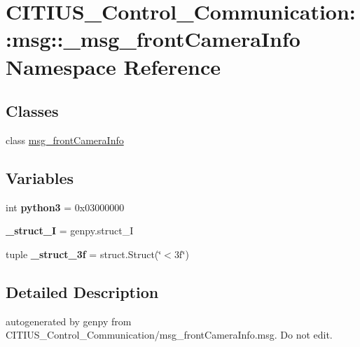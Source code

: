 \hypertarget{namespace_c_i_t_i_u_s___control___communication_1_1msg_1_1__msg__front_camera_info}{\section{\-C\-I\-T\-I\-U\-S\-\_\-\-Control\-\_\-\-Communication\-:\-:msg\-:\-:\-\_\-msg\-\_\-front\-Camera\-Info \-Namespace \-Reference}
\label{namespace_c_i_t_i_u_s___control___communication_1_1msg_1_1__msg__front_camera_info}
}
\subsection*{\-Classes}
\begin{DoxyCompactItemize}
\item 
class \hyperlink{class_c_i_t_i_u_s___control___communication_1_1msg_1_1__msg__front_camera_info_1_1msg__front_camera_info}{msg\-\_\-front\-Camera\-Info}
\end{DoxyCompactItemize}
\subsection*{\-Variables}
\begin{DoxyCompactItemize}
\item 
\hypertarget{namespace_c_i_t_i_u_s___control___communication_1_1msg_1_1__msg__front_camera_info_a7ce05f08299f9766d282e7460d17cfef}{int {\bfseries python3} = 0x03000000}\label{namespace_c_i_t_i_u_s___control___communication_1_1msg_1_1__msg__front_camera_info_a7ce05f08299f9766d282e7460d17cfef}

\item 
\hypertarget{namespace_c_i_t_i_u_s___control___communication_1_1msg_1_1__msg__front_camera_info_a6d01d98f72126a17ae27c29c40e4e4af}{{\bfseries \-\_\-struct\-\_\-\-I} = genpy.\-struct\-\_\-\-I}\label{namespace_c_i_t_i_u_s___control___communication_1_1msg_1_1__msg__front_camera_info_a6d01d98f72126a17ae27c29c40e4e4af}

\item 
\hypertarget{namespace_c_i_t_i_u_s___control___communication_1_1msg_1_1__msg__front_camera_info_a603f56519ffcc2014028300bc27c3ee8}{tuple {\bfseries \-\_\-struct\-\_\-3f} = struct.\-Struct(\char`\"{}$<$3f\char`\"{})}\label{namespace_c_i_t_i_u_s___control___communication_1_1msg_1_1__msg__front_camera_info_a603f56519ffcc2014028300bc27c3ee8}

\end{DoxyCompactItemize}


\subsection{\-Detailed \-Description}
\begin{DoxyVerb}autogenerated by genpy from CITIUS_Control_Communication/msg_frontCameraInfo.msg. Do not edit.\end{DoxyVerb}
 